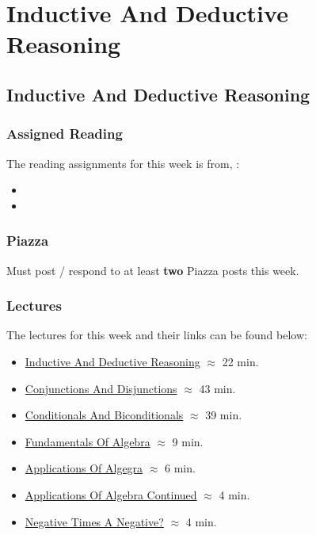 \clearpage

\newcommand{\ChapTitle}{Inductive And Deductive Reasoning}
\newcommand{\SectionTitle}{Inductive And Deductive Reasoning}

\chapter{\ChapTitle}
\section{\SectionTitle}

\subsection{Assigned Reading}

The reading assignments for this week is from, \Textbook:

\begin{itemize}
    \item {}
    \item {}
\end{itemize}

\subsection{Piazza}

Must post / respond to at least \textbf{two} Piazza posts this week.

\subsection{Lectures}

The lectures for this week and their links can be found below:

\begin{itemize}
    \item \href{https://drive.explaineverything.com/thecode/GYWSZFB}{Inductive And Deductive Reasoning} $\approx$ 22 min.
    \item \href{https://applied.cs.colorado.edu/mod/hvp/view.php?id=51549}{Conjunctions And Disjunctions} $\approx$ 43 min.
    \item \href{https://applied.cs.colorado.edu/mod/hvp/view.php?id=51550}{Conditionals And Biconditionals} $\approx$ 39 min.
    \item \href{https://applied.cs.colorado.edu/mod/hvp/view.php?id=51552}{Fundamentals Of Algebra} $\approx$ 9 min.
    \item \href{https://applied.cs.colorado.edu/mod/hvp/view.php?id=51553}{Applications Of Algegra} $\approx$ 6 min.
    \item \href{https://applied.cs.colorado.edu/mod/hvp/view.php?id=51554}{Applications Of Algebra Continued} $\approx$ 4 min.
    \item \href{https://applied.cs.colorado.edu/mod/hvp/view.php?id=51555}{Negative Times A Negative?} $\approx$ 4 min.
\end{itemize}

